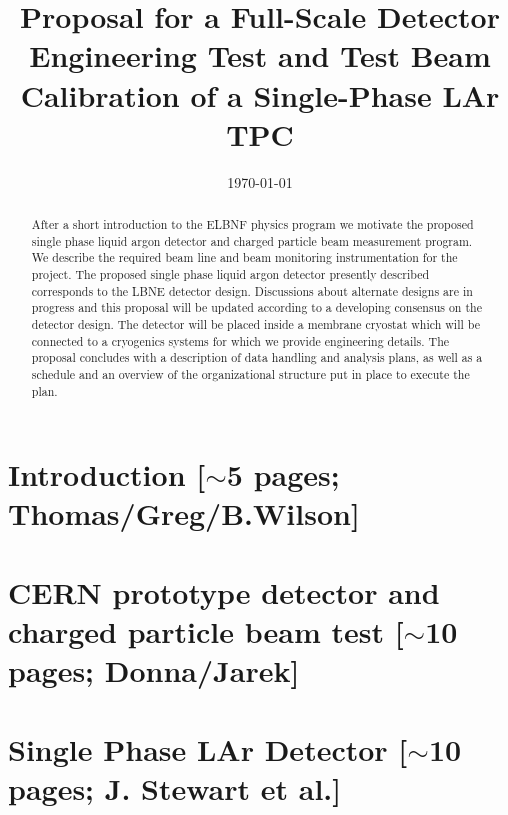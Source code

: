 \documentclass[12pt]{article}
\begin{document}
\linenumbers

\title{  Proposal for a Full-Scale Detector Engineering Test and Test Beam Calibration of a Single-Phase LAr TPC}

\date{\today}
	

\maketitle




\begin{abstract}

After a short introduction to the ELBNF physics program we motivate the proposed single phase liquid argon detector and charged particle beam measurement program. 
We describe the required beam line and beam monitoring instrumentation for the project.
The proposed single phase liquid argon detector presently described corresponds to the LBNE detector design. Discussions about alternate designs are in progress and this proposal will be updated according to a developing consensus on the detector design. The detector will be placed inside a membrane cryostat which will be connected to a cryogenics systems for which we provide engineering details. The proposal concludes with a description of data handling and analysis plans, as well as a schedule and an overview of the organizational structure put in place to execute the plan.



\end{abstract}

\newpage
\tableofcontents

\newpage

\section{Introduction [$\sim$5 pages; {\color{red} Thomas/Greg/B.Wilson}]}
	
%	

\section{CERN prototype detector and charged particle beam test [$\sim$10 pages; {\color{red} Donna/Jarek}]}
	
	

\section{Single Phase LAr Detector [$\sim$10 pages; {\color{red} J. Stewart et al.}]}
\rm
\end{document}
